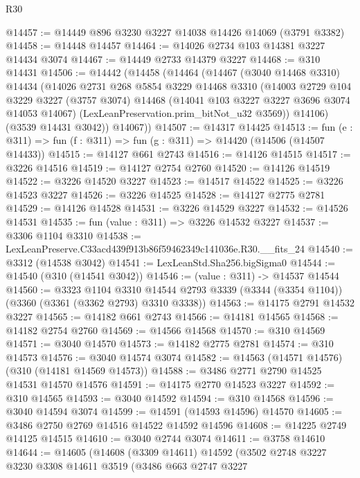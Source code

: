 \begin{lexlean}{R30}
\begin{coremodule}
@14457 := @14449 @896 @3230 @3227 @14038 @14426 @14069 (@3791 @3382)
@14458 := @14448 @14457
@14464 := @14026 @2734 @103 @14381 @3227 @14434 @3074
@14467 := @14449 @2733 @14379 @3227
@14468 := @310 @14431
@14506 := @14442
    (@14458
      (@14464
        (@14467
          (@3040 @14468 @3310)
          @14434
          (@14026
            @2731
            @268
            @5854
            @3229
            @14468
            @3310
            (@14003
              @2729
              @104
              @3229
              @3227
              (@3757 @3074)
              @14468
              (@14041 @103 @3227 @3227 @3696 @3074 @14053 @14067)
              (LexLeanPreservation.prim_bitNot_u32 @3569))
            @14106)
          (@3539 @14431 @3042))
        @14067))
@14507 := @14317 @14425
@14513 := fun (e : @311) => fun (f : @311) => fun (g : @311) => @14420 (@14506 (@14507 @14433))
@14515 := @14127 @661 @2743
@14516 := @14126 @14515
@14517 := @3226 @14516
@14519 := @14127 @2754 @2760
@14520 := @14126 @14519
@14522 := @3226 @14520 @3227
@14523 := @14517 @14522
@14525 := @3226 @14523 @3227
@14526 := @3226 @14525
@14528 := @14127 @2775 @2781
@14529 := @14126 @14528
@14531 := @3226 @14529 @3227
@14532 := @14526 @14531
@14535 := fun (value : @311) => @3226 @14532 @3227
@14537 := @3306 @1104 @3310
@14538 := LexLeanPreserve.C33acd439f913b86f59462349c141036e.R30.__fits_24
@14540 := @3312 (@14538 @3042)
@14541 := LexLeanStd.Sha256.bigSigma0
@14544 := @14540 (@310 (@14541 @3042))
@14546 := (value : @311) -> @14537 @14544
@14560 := @3323
    @1104
    @3310
    @14544
    @2793
    @3339
    (@3344 (@3354 @1104))
    (@3360 (@3361 (@3362 @2793) @3310 @3338))
@14563 := @14175 @2791 @14532 @3227
@14565 := @14182 @661 @2743
@14566 := @14181 @14565
@14568 := @14182 @2754 @2760
@14569 := @14566 @14568
@14570 := @310 @14569
@14571 := @3040 @14570
@14573 := @14182 @2775 @2781
@14574 := @310 @14573
@14576 := @3040 @14574 @3074
@14582 := @14563 (@14571 @14576) (@310 (@14181 @14569 @14573))
@14588 := @3486 @2771 @2790 @14525 @14531 @14570 @14576
@14591 := @14175 @2770 @14523 @3227
@14592 := @310 @14565
@14593 := @3040 @14592
@14594 := @310 @14568
@14596 := @3040 @14594 @3074
@14599 := @14591 (@14593 @14596) @14570
@14605 := @3486 @2750 @2769 @14516 @14522 @14592 @14596
@14608 := @14225 @2749 @14125 @14515
@14610 := @3040 @2744 @3074
@14611 := @3758 @14610
@14644 := @14605
    (@14608
      (@3309 @14611)
      @14592
      (@3502
        @2748
        @3227
        @3230
        @3308
        @14611
        @3519
        (@3486
          @663
          @2747
          @3227

\end{coremodule}
\end{lexlean}
